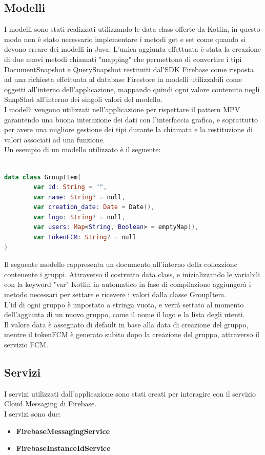 \subsection{Modelli}
I modelli sono stati realizzati utilizzando le data class offerte da Kotlin, in questo modo non è stato necessario implementare i metodi get e set come quando si devono creare dei modelli in Java. L'unica aggiunta effettuata è stata la creazione di due nuovi metodi chiamati "mapping" che permettono di convertire i tipi DocumentSnapshot e QuerySnapshot restituiti dal'SDK Firebase come risposta ad una richiesta effettuata al database Firestore in modelli utilizzabili come oggetti all'interno dell'applicazione, mappando quindi ogni valore contenuto negli SnapShot all'interno dei singoli valori del modello.\\
I modelli vengono utilizzati nell'applicazione per rispettare il pattern MPV garantendo una buona interazione dei dati con l'interfaccia grafica, e soprattutto per avere una migliore gestione dei tipi durante la chiamata e la restituzione di valori associati ad una funzione.\\
Un esempio di un modello utilizzato è il seguente:
\begin{lstlisting}[language=kotlin,caption={Aggiunta elemento Todolist}]

data class GroupItem(
        var id: String = "",
        var name: String? = null,
        var creation_date: Date = Date(),
        var logo: String? = null,
        var users: Map<String, Boolean> = emptyMap(),
        var tokenFCM: String? = null
)
\end{lstlisting}
Il seguente modello rappresenta un documento all'interno della collezzione contenente i gruppi. Attraverso il costrutto data class, e inizializzando le variabili con la keyword "var" Kotlin in automatico in fase di compilazione aggiungerà i metodo necessari per settare e ricevere i valori dalla classe GroupItem.\\
L'id di ogni gruppo è impostato a stringa vuota, e verrà settato al momento dell'aggiunta di un nuovo gruppo, come il nome il logo e la lista degli utenti.\\
Il valore data è assegnato di default in base alla data di creazione del gruppo, mentre il tokenFCM è generato subito dopo la creazione del gruppo, attraverso il servizio FCM.

\subsection{Servizi}
I servizi utilizzati dall'applicazione sono stati creati per interagire con il servizio Cloud Messaging di Firebase.\\
I servizi sono due:
\begin{itemize}
    \item \textbf{FirebaseMessagingService}
    \item \textbf{FirebaseInstanceIdService}
\end{itemize}

